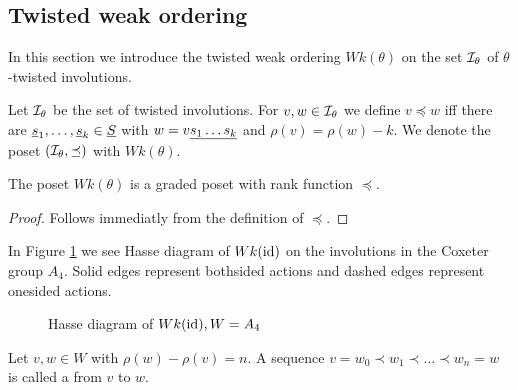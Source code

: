 \subsection{Twisted weak ordering}
\label{sec:twisted-involutions-twisted-weak-ordering}

In this section we introduce the twisted weak ordering $Wk(\theta)$ on the set $\mathcal{I}_{\theta}$ of $\theta$-twisted involutions.

\begin{defi}
	Let $\mathcal{I}_{\theta}$ be the set of twisted involutions. For $v,w \in \mathcal{I}_{\theta}$ we define $v \preceq w$ iff there are $\underline{s}_1, \ldots, \underline{s}_k \in \underline{S}$ with $w = v \underline{ s_1 \ldots s_k }$ and $\rho(v) = \rho(w) - k$. We denote the poset $(\mathcal{I}_{\theta},\preceq)$ with $Wk(\theta)$.
\end{defi}

\begin{lemm}
	The poset $Wk(\theta)$ is a graded poset with rank function $\preceq$.

	\begin{proof}
		Follows immediatly from the definition of $\preceq$.
	\end{proof}
\end{lemm}

\begin{exam}
	In Figure \ref{fig:a4} we see Hasse diagram of $Wk(\operatorname{id})$ on the involutions in the Coxeter group $A_4$. Solid edges represent bothsided actions and dashed edges represent onesided actions.
	\begin{figure}[ht]
		\centering
		
		\caption{Hasse diagram of $Wk(\operatorname{id}), W = A_4$}
		\label{fig:a4}
	\end{figure}
\end{exam}

\begin{defi}
	Let $v,w \in W$ with $\rho(w) - \rho(v) = n$. A sequence $v = w_0 \prec w_1 \prec \ldots \prec w_n = w$ is called a  from $v$ to $w$.
\end{defi}

\todo